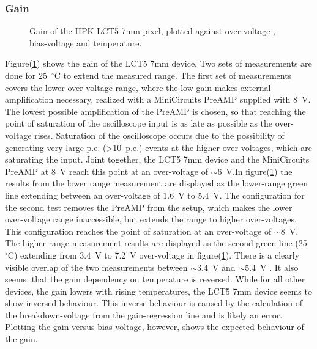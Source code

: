 \documentclass[12pt,article,type=msc,colorback,accentcolor=tud9c]{tudthesis}
\begin{document}
\subsubsection{Gain}
\label{subsubsec:LCT57Gain}
\begin{figure}[t!]
\begin{centering}
\caption[LCT5 7mm gain]{Gain of the HPK LCT5 7mm pixel, plotted against over-voltage , bias-voltage and temperature.}
\label{fig:LCT57_Gain}
\end{centering}
\end{figure}

Figure(\ref{fig:LCT57_Gain}) shows the gain of the LCT5 7mm device. Two sets of measurements are done for 25~$^\circ$C to extend the measured range. The first set of measurements covers the lower over-voltage range, where the low gain makes external amplification necessary, realized with a MiniCircuits PreAMP supplied with 8~V. The lowest possible amplification of the PreAMP is chosen, so that reaching the point of saturation of the oscilloscope input is as late as possible as the over-voltage rises. Saturation of the oscilloscope occurs due to the possibility of generating very large p.e. (>10~p.e.) events at the higher over-voltages, which are saturating the input. Joint together, the LCT5 7mm device and the MiniCircuits PreAMP at 8~V reach this point at an over-voltage of $\sim$6~V.In figure(\ref{fig:LCT57_Gain}) the results from the lower range measurement are displayed as the lower-range green line extending between an over-voltage of 1.6~V to 5.4~V.
The configuration for the second test removes the PreAMP from the setup, which makes the lower over-voltage range inaccessible, but extends the range to higher over-voltages. This configuration reaches the point of saturation at an over-voltage of $\sim$8~V. The higher range measurement results are displayed as the second green line (25~$^\circ$C) extending from 3.4~V to 7.2~V over-voltage in figure(\ref{fig:LCT57_Gain}). There is a clearly visible overlap of the two measurements between $\sim$3.4~V and $\sim$5.4~V . It also seems, that the gain dependency on temperature is reversed. While for all other devices, the gain lowers with rising temperatures, the LCT5 7mm device seems to show inversed behaviour. This inverse behaviour is caused by the calculation of the breakdown-voltage from the gain-regression line and is likely an error. Plotting the gain versus bias-voltage, however, shows the expected behaviour of the gain.
\end{document}
